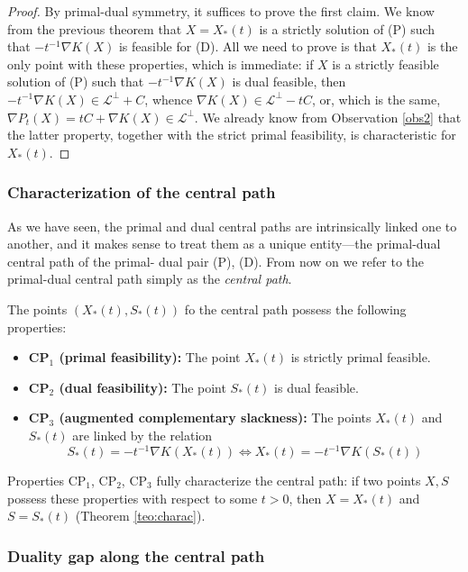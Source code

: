 \documentclass[11pt,a4paper]{article}
\begin{document}
\begin{proof}
By primal-dual symmetry, it suffices to prove the first claim. We know from the previous theorem that $X=X_*(t)$ is a strictly solution of (P) such that $-t^{-1}\nabla K(X)$ is feasible for (D). All we need to prove is that $X_*(t)$ is the only point with these properties, which is immediate: if $X$ is a strictly feasible solution of (P) such that $-t^{-1}\nabla K(X)$ is dual feasible, then $-t^{-1}\nabla K(X) \in \mathcal{L}^\perp+C$, whence $\nabla K(X)\in \mathcal{L}^\perp-tC$, or, which is the same, $\nabla P_t(X) = tC+\nabla K(X) \in \mathcal{L}^\perp$. We already know from Observation \ref{obs2} that the latter property, together with the strict primal feasibility, is characteristic for $X_*(t)$.
\end{proof}

\subsubsection{Characterization of the central path}

As we have seen, the primal and dual central paths are intrinsically linked one to another, and
it makes sense to treat them as a unique entity—the primal-dual central path of the primal-
dual pair (P), (D). From now on we refer to the primal-dual central path simply as the
\textit{central path}.

The points $(X_*(t), S_*(t))$ fo the central path possess the following properties:

\begin{itemize}
    \item \textbf{CP$_1$ (primal feasibility):} The point $X_*(t)$ is strictly primal feasible.
    \item \textbf{CP$_2$ (dual feasibility):} The point $S_*(t)$ is dual feasible.
    \item \textbf{CP$_3$ (augmented complementary slackness):} The points $X_*(t)$ and $S_*(t)$ are linked by the relation
    \[S_*(t) = -t^{-1}\nabla K(X_*(t)) \iff X_*(t) = -t^{-1}\nabla K(S_*(t))\]
\end{itemize}

Properties CP$_1$, CP$_2$, CP$_3$ fully characterize the central path: if two points
$X, S$ possess these properties with respect to some $t > 0$, then $X=X_*(t)$ and $S=S_*(t)$ (Theorem \ref{teo:charac}).

\subsubsection{Duality gap along the central path}
\end{document}
